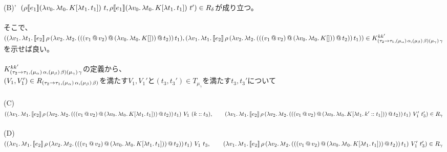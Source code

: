   (B)'\ $(\rho [\![{e_1}]\!] (\lambda{v_0}.\,{\lambda{t_0}.\,{K[\lambda{t_1}.\,{t_1}]}})\ t, \rho [\![{e_1}]\!] (\lambda{v_0}.\,{\lambda{t_0}.\,{K[\lambda{t_1}.\,{t_1}]}})\ t')\in R_{\delta}$が成り立つ。\\
\\
そこで、\\
$((\lambda{v_1}.\,{\lambda{t_1}.\,{[\![{e_2}]\!]\,\rho\,(\lambda{v_2}.\,{\lambda{t_2}.\,{({({({v_1}\,@\,{v_2})}\,@\,{(\lambda{v_0}.\,{\lambda{t_0}.\,{K[]}})})}\,@\,{t_2})}})\,t_1}}),\\
 (\lambda{v_1}.\,{\lambda{t_1}.\,{[\![{e_2}]\!]\,\rho\,(\lambda{v_2}.\,{\lambda{t_2}.\,{({({({v_1}\,@\,{v_2})}\,@\,{(\lambda{v_0}.\,{\lambda{t_0}.\,{K[]}})})}\,@\,{t_2})}})\,t_1}}))\in K^{kk'}_{(\tau_2\rightarrow{\tau_1},(\mu_{\alpha})\,\alpha,(\mu_{\beta})\,\beta) (\mu_{\gamma})\,\gamma}$\\
 を示せば良い。\\
 \\
 $K^{kk'}_{(\tau_2\rightarrow{\tau_1},(\mu_{\alpha})\,\alpha,(\mu_{\beta})\,\beta) (\mu_{\gamma})\,\gamma}$の定義から、\\
 $(V_1,V_1')\in R_{(\tau_2\rightarrow{\tau_1},(\mu_{\alpha})\,\alpha,(\mu_{\beta})\,\beta)}$を満たす$V_1,V_1'$と$(t_3,t_3')\in T_{\mu_{\gamma}}$を満たす$t_3,t_3'$について\\
 \\
 (C)\ $(\LamP{v_1}{\Lam{t_1}{\CPS{e_2}{\rho}
            {\LamP{v_2}{\Lam{t_2}
                {\AppP{\AppP{\AppP{v_1}{v_2}}
                    {\LamP{v_0}{\Lam{t_0}
                        {K[\Lam{t_1}{t_1}]}}}}{t_2}}}}{t_1}}}\ V_1\ (\Cons{k}{t_3}),\\
   \qquad    \LamP{v_1}{\Lam{t_1}{\CPS{e_2}{\rho}
            {\LamP{v_2}{\Lam{t_2}
                {\AppP{\AppP{\AppP{v_1}{v_2}}
                    {\LamP{v_0}{\Lam{t_0}
                        {K[\Lam{t_1}{\Cons{k'}{t_1}}]}}}}{t_2}}}}{t_1}}}\ V_1'\ t_3')\in R_{\gamma}$\\
   \\
 (D)\ $(\LamP{v_1}{\Lam{t_1}{\CPS{e_2}{\rho}
            {\LamP{v_2}{\Lam{t_2}
                {\AppP{\AppP{\AppP{v_1}{v_2}}
                    {\LamP{v_0}{\Lam{t_0}
                        {K[\Lam{t_1}{t_1}]}}}}{t_2}}}}{t_1}}}\ V_1\ t_3,\\
   \qquad    \LamP{v_1}{\Lam{t_1}{\CPS{e_2}{\rho}
            {\LamP{v_2}{\Lam{t_2}
                {\AppP{\AppP{\AppP{v_1}{v_2}}
                    {\LamP{v_0}{\Lam{t_0}
                        {K[\Lam{t_1}{t_1}]}}}}{t_2}}}}{t_1}}}\ V_1'\ t_3')\in R_{\gamma}$\\
